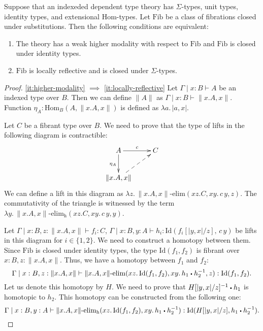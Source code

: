 \documentclass[reqno]{mscs}
\newcommand{\ob}{}
\newcommand{\fs}[1]{\mathrm{#1}}
\newcommand{\Hom}{\fs{Hom}}
\newcommand{\Id}{\fs{Id}}
\newcommand{\sym}[1]{#1^{-1}}
\newcommand{\Fib}{\fs{Fib}}
\numberwithin{figure}{section}
\newcommand{\ct}{%
  \mathchoice{\mathbin{\raisebox{0.25ex}{$\displaystyle\centerdot$}}}%
             {\mathbin{\raisebox{0.25ex}{$\centerdot$}}}%
             {\mathbin{\raisebox{0.25ex}{$\scriptstyle\,\centerdot\,$}}}%
             {\mathbin{\raisebox{0.25ex}{$\scriptscriptstyle\,\centerdot\,$}}}
}
\begin{document}
\begin{prop}
Suppose that an indexeded dependent type theory has $\Sigma$-types, unit types, identity types, and extensional $\Hom$-types.
Let $\Fib$ be a class of fibrations closed under substitutions.
Then the following conditions are equivalent:
\begin{enumerate}
\item \label{it:higher-modality} The theory has a weak higher modality with respect to $\Fib$ and $\Fib$ is closed under identity types.
\item \label{it:locally-reflective} $\Fib$ is locally reflective and is closed under $\Sigma$-types.
\end{enumerate}
\end{prop}
\begin{proof}
\eqref{it:higher-modality} $\implies$ \eqref{it:locally-reflective}
Let $\Gamma \mid x : B \vdash A \ob$ be an indexed type over $B$.
Then we can define $\| A \|$ as $\Gamma \mid x : B \vdash \| x.A, x \|$.
Function $\eta_A : \Hom_B(A, \| x.A, x \|)$ is defined as $\lambda a.\,| a, x |$.

Let $C$ be a fibrant type over $B$.
We need to prove that the type of lifts in the following diagram is contractible:
\[ \xymatrix{ A \ar[r]^c \ar[d]_{\eta_A} & C \\
              \| x.A, x \| \ar@{-->}[ur]
            } \]
We can define a lift in this diagram as $\lambda z.\,\| x.A, x \|\text{-}\fs{elim}(x z. C, x y.\,c\,y, z)$.
The commutativity of the triangle is witnessed by the term $\lambda y.\,\| x.A, x \|\text{-}\fs{elim_h}(x z. C, x y.\,c\,y, y)$.

Let $\Gamma \mid x : B, z : \| x.A, x \| \vdash f_i : C$, $\Gamma \mid x : B, y : A \vdash h_i : \Id(f_i[|y,x|/z],\,c\,y)$ be lifts in this diagram for $i \in \{1,2\}$.
We need to construct a homotopy between them.
Since $\Fib$ is closed under identity types, the type $\Id(f_1,f_2)$ is fibrant over $x : B, z : \| x.A, x \|$.
Thus, we have a homotopy between $f_1$ and $f_2$:
\[ \Gamma \mid x : B, z : \| x.A, x \| \vdash \| x.A, x \|\text{-}\fs{elim}(x z.\,\Id(f_1,f_2), x y.\,h_1 \ct \sym{h_2}, z) : \Id(f_1, f_2). \]
Let us denote this homotopy by $H$.
We need to prove that $\sym{H[|y,x|/z]} \ct h_1$ is homotopic to $h_2$.
This homotopy can be constructed from the following one:
\[ \Gamma \mid x : B, y : A \vdash \| x.A, x \|\text{-}\fs{elim_h}(x z.\,\Id(f_1,f_2), x y.\,h_1 \ct \sym{h_2}) : \Id(H[|y,x|/z], h_1 \ct \sym{h_2}). \]


\end{proof}
\end{document}
